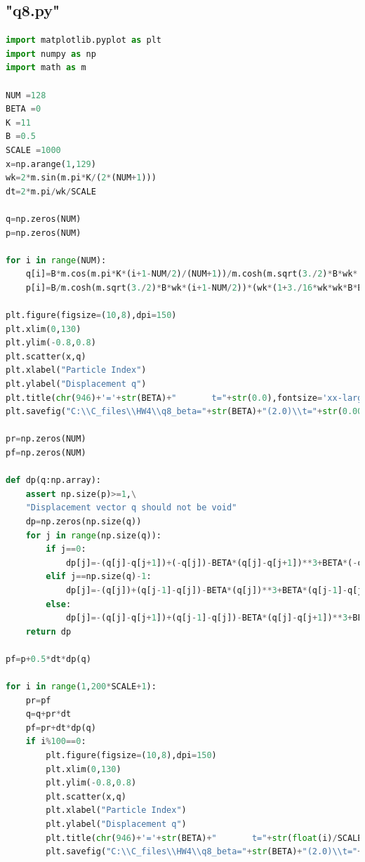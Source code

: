 \documentclass[10pt, a4paper]{article}
\begin{document}
    \subsection{"q8.py"}
    \begin{lstlisting}[language=Python]
import matplotlib.pyplot as plt
import numpy as np
import math as m

NUM =128
BETA =0
K =11
B =0.5
SCALE =1000
x=np.arange(1,129)
wk=2*m.sin(m.pi*K/(2*(NUM+1)))
dt=2*m.pi/wk/SCALE

q=np.zeros(NUM)
p=np.zeros(NUM)

for i in range(NUM):
    q[i]=B*m.cos(m.pi*K*(i+1-NUM/2)/(NUM+1))/m.cosh(m.sqrt(3./2)*B*wk*(i+1-NUM/2))
    p[i]=B/m.cosh(m.sqrt(3./2)*B*wk*(i+1-NUM/2))*(wk*(1+3./16*wk*wk*B*B)*m.sin(m.pi*K*(i+1-NUM/2)/(NUM+1))+m.sqrt(3./2)*B*m.cos(m.pi*K*(i+1-NUM/2)/(NUM+1))*m.sin(m.pi*K/(NUM+1))*m.tanh(m.sqrt(3./2)*B*wk*(i+1-NUM/2)))

plt.figure(figsize=(10,8),dpi=150)
plt.xlim(0,130)
plt.ylim(-0.8,0.8)
plt.scatter(x,q)
plt.xlabel("Particle Index")
plt.ylabel("Displacement q")
plt.title(chr(946)+'='+str(BETA)+"       t="+str(0.0),fontsize='xx-large')
plt.savefig("C:\\C_files\\HW4\\q8_beta="+str(BETA)+"(2.0)\\t="+str(0.00)+".png")

pr=np.zeros(NUM)
pf=np.zeros(NUM)

def dp(q:np.array):
    assert np.size(p)>=1,\
    "Displacement vector q should not be void"
    dp=np.zeros(np.size(q))
    for j in range(np.size(q)):
        if j==0:
            dp[j]=-(q[j]-q[j+1])+(-q[j])-BETA*(q[j]-q[j+1])**3+BETA*(-q[j])**3
        elif j==np.size(q)-1:
            dp[j]=-(q[j])+(q[j-1]-q[j])-BETA*(q[j])**3+BETA*(q[j-1]-q[j])**3
        else:
            dp[j]=-(q[j]-q[j+1])+(q[j-1]-q[j])-BETA*(q[j]-q[j+1])**3+BETA*(q[j-1]-q[j])**3
    return dp

pf=p+0.5*dt*dp(q)

for i in range(1,200*SCALE+1):
    pr=pf
    q=q+pr*dt
    pf=pr+dt*dp(q)
    if i%100==0:
        plt.figure(figsize=(10,8),dpi=150)
        plt.xlim(0,130)
        plt.ylim(-0.8,0.8)
        plt.scatter(x,q)
        plt.xlabel("Particle Index")
        plt.ylabel("Displacement q")
        plt.title(chr(946)+'='+str(BETA)+"       t="+str(float(i)/SCALE),fontsize='xx-large')
        plt.savefig("C:\\C_files\\HW4\\q8_beta="+str(BETA)+"(2.0)\\t="+str(float(i)/SCALE)+".png")
    \end{lstlisting}
\end{document}
